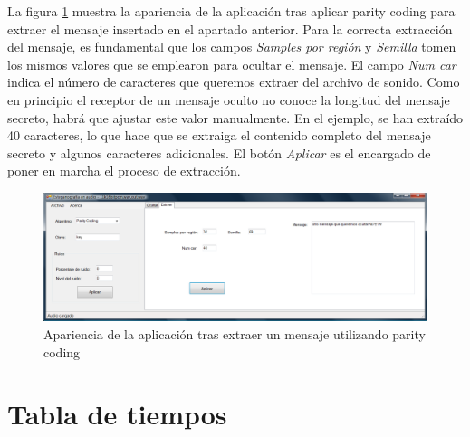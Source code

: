 \documentclass[12pt]{article}
\begin{document}
La figura \ref{ss5} muestra la apariencia de la aplicación tras aplicar parity coding para extraer el mensaje insertado en el apartado anterior. Para la correcta extracción del mensaje, es fundamental que los campos \emph{Samples por región} y \emph{Semilla} tomen los mismos valores que se emplearon para ocultar el mensaje. El campo \emph{Num car} indica el número de caracteres que queremos extraer del archivo de sonido. Como en principio el receptor de un mensaje oculto no conoce la longitud del mensaje secreto, habrá que ajustar este valor manualmente. En el ejemplo, se han extraído 40 caracteres, lo que hace que se extraiga el contenido completo del mensaje secreto y algunos caracteres adicionales. El botón \emph{Aplicar} es el encargado de poner en marcha el proceso de extracción.

\begin{figure}[h]
  \centering
    \includegraphics[width=\textwidth]{img/ss5}
  \caption{Apariencia de la aplicación tras extraer un mensaje utilizando parity coding}
  \label{ss5}
\end{figure}

\clearpage
\section{Tabla de tiempos}
\end{document}

